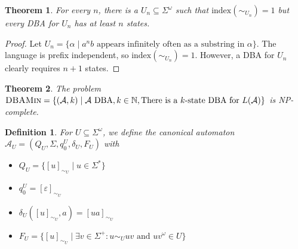 \documentclass{article}
\newtheorem{theorem}{Theorem}[section]
\newtheorem{definition}{Definition}
\begin{document}
\vspace{.5cm}
\begin{theorem}
	For every $n$, there is a $U_n \subseteq \Sigma^\omega$ such that $\text{index}(\sim_{U_n}) = 1$ but every DBA for $U_n$ has at least $n$ states.
\end{theorem}
\begin{proof}
	Let $U_n = \{\alpha \mid a^n b \text{ appears infinitely often as a substring in } \alpha \}$. The language is prefix independent, so $\text{index}(\sim_{U_n}) = 1$. However, a DBA for $U_n$ clearly requires $n+1$ states.
\end{proof}


\vspace{.5cm}
\begin{theorem}
	The problem $\textsc{DBAMin} = \{ (\mathcal{A}, k) \mid \mathcal{A} \text{ DBA}, k \in \mathbb{N}, \text{There is a } k \text{-state DBA for } L(\mathcal{A}) \}$ is NP-complete.
\end{theorem}


\vspace{.5cm}
\begin{definition}
	For $U \subseteq \Sigma^\omega$, we define the canonical automaton $\mathcal{A}_U = (Q_U, \Sigma, q_0^U, \delta_U, F_U)$ with 
	\begin{itemize}
		\item $Q_U = \{ [u]_{\sim_U} \mid u \in \Sigma^* \}$
		\item $q_0^U = [\varepsilon]_{\sim_U}$
		\item $\delta_U([u]_{\sim_U}, a) = [ua]_{\sim_U}$
		\item $F_U = \{ [u]_{\sim_U} \mid \exists v \in \Sigma^+: u \sim_U uv \text{ and } uv^\omega \in U\}$ 
	\end{itemize}
\end{definition}
\end{document}

